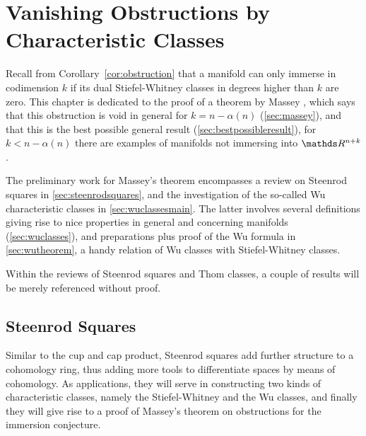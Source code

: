 % 

\chapter{Vanishing Obstructions by Characteristic Classes}
\label{chap:massey}
Recall from Corollary~\ref{cor:obstruction} that a manifold can
only immerse in codimension $k$ if its dual Stiefel-Whitney classes in
degrees higher than $k$ are zero.
This chapter is dedicated to the proof of a theorem by Massey
\cite{massey}, which says that this obstruction is void in general for
$k=n-\alpha(n)$ (\autoref{sec:massey}), and that this is the best
possible general result (\autoref{sec:bestpossibleresult}), \idest for
$k<n-\alpha(n)$ there are examples of manifolds not immersing into
$\R^{n+k}$.

The preliminary work for Massey's theorem encompasses a review on
Steenrod squares in \autoref{sec:steenrodsquares}, and the
investigation of the so-called Wu characteristic classes in
\autoref{sec:wuclassesmain}.
The latter involves several definitions giving rise to nice properties
in general and concerning manifolds (\autoref{sec:wuclasses}), and
preparations plus proof of the Wu formula in \autoref{sec:wutheorem},
a handy relation of Wu classes with Stiefel-Whitney classes.

Within the reviews of Steenrod squares and Thom classes, a couple of
results will be merely referenced without proof.

\section{Steenrod Squares}\label{sec:steenrodsquares}
Similar to the cup and cap product, Steenrod squares add further
structure to a cohomology ring, thus adding more tools to
differentiate spaces by means of cohomology.
As applications, they will serve in constructing two kinds of
characteristic classes, namely the Stiefel-Whitney and the Wu
classes, and finally they will give rise to a proof of Massey's
theorem on obstructions for the immersion conjecture.


